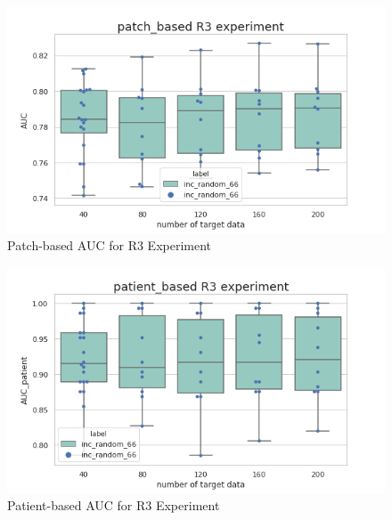 ~\\
\begin{figure}[H]
    \hfil
    \begin{minipage}[t]{0.9\textwidth}
        \includegraphics[width=\textwidth]{fig/R3_num_patch.png}
        \caption{\label{fig:parallel1}Patch-based AUC for R3 Experiment}
    \end{minipage}
    \hfil
\end{figure}
\begin{figure}[H]
    \hfil
    \begin{minipage}[t]{0.9\textwidth}
        \includegraphics[width=\textwidth]{fig/R3_num_patient.png}
        \caption{\label{fig:parallel1}Patient-based AUC for R3 Experiment}
    \end{minipage}
    \hfil
\end{figure}
~\\

